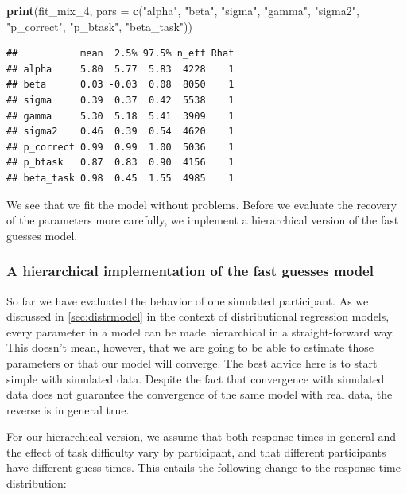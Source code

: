 \documentclass[12pt,]{krantz}
\newenvironment{Shaded}{\begin{snugshade}}{\end{snugshade}}
\newcommand{\DataTypeTok}[1]{\textcolor[rgb]{0.13,0.29,0.53}{#1}}
\newcommand{\DecValTok}[1]{\textcolor[rgb]{0.00,0.00,0.81}{#1}}
\newcommand{\KeywordTok}[1]{\textcolor[rgb]{0.13,0.29,0.53}{\textbf{#1}}}
\newcommand{\NormalTok}[1]{#1}
\newcommand{\StringTok}[1]{\textcolor[rgb]{0.31,0.60,0.02}{#1}}
\theoremstyle{definition}
\theoremstyle{definition}
\theoremstyle{definition}
\theoremstyle{remark}
\begin{document}
\begin{Shaded}
\begin{Highlighting}[]
\KeywordTok{print}\NormalTok{(fit_mix_}\DecValTok{4}\NormalTok{,}
      \DataTypeTok{pars =} \KeywordTok{c}\NormalTok{(}\StringTok{"alpha"}\NormalTok{, }\StringTok{"beta"}\NormalTok{, }\StringTok{"sigma"}\NormalTok{, }\StringTok{"gamma"}\NormalTok{, }\StringTok{"sigma2"}\NormalTok{,}
               \StringTok{"p_correct"}\NormalTok{, }\StringTok{"p_btask"}\NormalTok{, }\StringTok{"beta_task"}\NormalTok{)) }
\end{Highlighting}
\end{Shaded}

\begin{verbatim}
##           mean  2.5% 97.5% n_eff Rhat
## alpha     5.80  5.77  5.83  4228    1
## beta      0.03 -0.03  0.08  8050    1
## sigma     0.39  0.37  0.42  5538    1
## gamma     5.30  5.18  5.41  3909    1
## sigma2    0.46  0.39  0.54  4620    1
## p_correct 0.99  0.99  1.00  5036    1
## p_btask   0.87  0.83  0.90  4156    1
## beta_task 0.98  0.45  1.55  4985    1
\end{verbatim}

We see that we fit the model without problems. Before we evaluate the recovery of the parameters more carefully, we implement a hierarchical version of the fast guesses model.

\hypertarget{a-hierarchical-implementation-of-the-fast-guesses-model}{%
\subsubsection{A hierarchical implementation of the fast guesses model}\label{a-hierarchical-implementation-of-the-fast-guesses-model}}

So far we have evaluated the behavior of one simulated participant.
As we discussed in \ref{sec:distrmodel} in the context of distributional regression models, every parameter in a model can be made hierarchical in a straight-forward way. This doesn't mean, however, that we are going to be able to estimate those parameters or that our model will converge. The best advice here is to start simple with simulated data. Despite the fact that convergence with simulated data does not guarantee the convergence of the same model with real data, the reverse is in general true.

For our hierarchical version, we assume that both response times in general and the effect of task difficulty vary by participant, and that different participants have different guess times. This entails the following change to the response time distribution:
\end{document}
